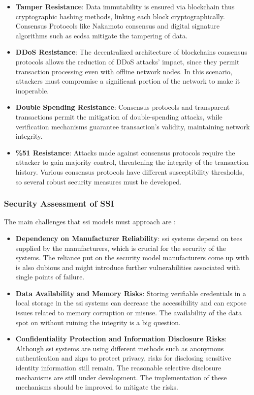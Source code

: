 \begin{itemize}
  \item \textbf{Tamper Resistance}: Data immutability is ensured via blockchain thus cryptographic hashing methods, linking each block cryptographically. Consensus 
  Protocols like Nakamoto consensus and digital signature algorithms such as \gls{ecdsa} mitigate the tampering of data.
  \item \textbf{DDoS Resistance}: The decentralized architecture of blockchains consensus protocols allows the reduction of DDoS attacks' impact, since they permit 
  transaction processing even with offline network nodes. In this scenario, attackers must compromise a significant portion of the network to make it inoperable.
  \item \textbf{Double Spending Resistance}: Consensus protocols and transparent transactions permit the mitigation of double-spending attacks, while verification 
  mechanisms guarantee transaction's validity, maintaining network integrity.
  \item \textbf{\%51 Resistance}: Attacks made against consensus protocols require the attacker to gain majority control, threatening the integrity of the transaction 
  history. Various consensus protocols have different susceptibility thresholds, so several robust security measures must be developed.
\end{itemize}

\subsubsection{Security Assessment of SSI}

The main challenges that \gls{ssi} models must approach are \cite{CyberSecurity}:

\begin{itemize}
  \item \textbf{Dependency on Manufacturer Reliability}: \gls{ssi} systems depend on \gls{tee}s supplied by the manufacturers, which is crucial for 
  the security of the systems. The reliance put on the security model manufacturers come up with is also dubious and might introduce further vulnerabilities associated with 
  single points of failure.
  \item \textbf{Data Availability and Memory Risks}: Storing verifiable credentials in a local storage in the \gls{ssi} systems can decrease the accessibility and can expose 
  issues related to memory corruption or misuse. The availability of the data spot on without ruining the integrity is a big question.
  \item \textbf{Confidentiality Protection and Information Disclosure Risks}: Although \gls{ssi} systems are using different methods such as anonymous authentication and 
  \gls{zkp}s to protect privacy, risks for disclosing sensitive identity information still remain. The reasonable selective disclosure mechanisms are 
  still under development. The implementation of these mechanisms should be improved to mitigate the risks.
\end{itemize}

